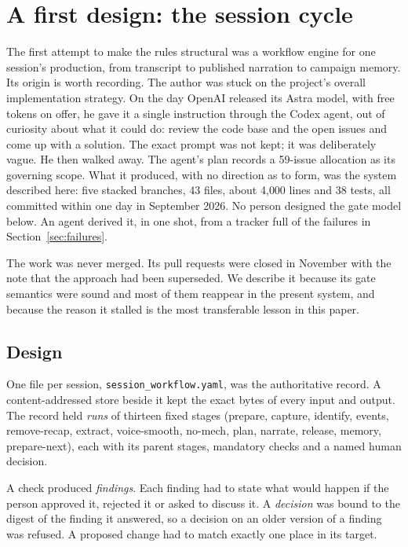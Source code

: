 \documentclass[11pt]{article}
\newcommand{\code}[1]{\texttt{#1}}
\begin{document}
\section{A first design: the session cycle}
\label{sec:cycle}

The first attempt to make the rules structural was a workflow engine for one session's
production, from transcript to published narration to campaign memory. Its origin is
worth recording. The author was stuck on the project's overall implementation strategy.
On the day OpenAI released its Astra model, with free tokens on offer, he gave it a
single instruction through the Codex agent, out of curiosity about what it could do:
review the code base and the open issues and come up with a solution. The exact prompt
was not kept; it was deliberately vague. He then walked away. The agent's plan records a
59-issue allocation as its governing scope. What it produced, with no direction as to
form, was the system described here: five stacked branches, 43 files, about 4{,}000
lines and 38 tests, all committed within one day in September 2026. No person designed
the gate model below. An agent derived it, in one shot, from a tracker full of the
failures in Section~\ref{sec:failures}.

The work was never merged. Its pull requests were closed in November with the note that
the approach had been superseded. We describe it because its gate semantics were sound
and most of them reappear in the present system, and because the reason it stalled is
the most transferable lesson in this paper.

\subsection{Design}

One file per session, \code{session\_workflow.yaml}, was the authoritative record. A
content-addressed store beside it kept the exact bytes of every input and output. The
record held \emph{runs} of thirteen fixed stages (prepare, capture, identify, events,
remove-recap, extract, voice-smooth, no-mech, plan, narrate, release, memory,
prepare-next), each with its parent stages, mandatory checks and a named human decision.

A check produced \emph{findings}. Each finding had to state what would happen if the
person approved it, rejected it or asked to discuss it. A \emph{decision} was bound to
the digest of the finding it answered, so a decision on an older version of a finding
was refused. A proposed change had to match exactly one place in its target.
\end{document}
